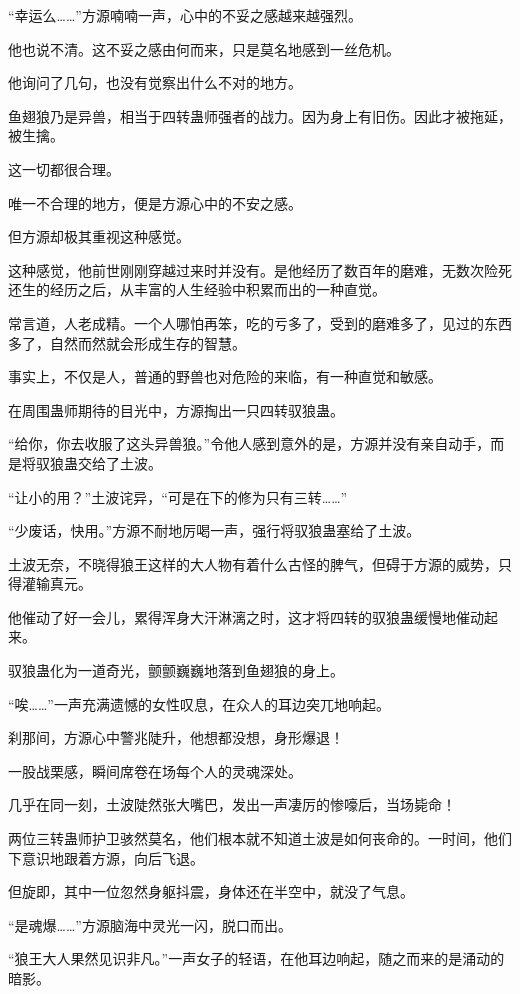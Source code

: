 \begin{this_body}
“幸运么……”方源喃喃一声，心中的不妥之感越来越强烈。

他也说不清。这不妥之感由何而来，只是莫名地感到一丝危机。

他询问了几句，也没有觉察出什么不对的地方。

鱼翅狼乃是异兽，相当于四转蛊师强者的战力。因为身上有旧伤。因此才被拖延，被生擒。

这一切都很合理。

唯一不合理的地方，便是方源心中的不安之感。

但方源却极其重视这种感觉。

这种感觉，他前世刚刚穿越过来时并没有。是他经历了数百年的磨难，无数次险死还生的经历之后，从丰富的人生经验中积累而出的一种直觉。

常言道，人老成精。一个人哪怕再笨，吃的亏多了，受到的磨难多了，见过的东西多了，自然而然就会形成生存的智慧。

事实上，不仅是人，普通的野兽也对危险的来临，有一种直觉和敏感。

在周围蛊师期待的目光中，方源掏出一只四转驭狼蛊。

“给你，你去收服了这头异兽狼。”令他人感到意外的是，方源并没有亲自动手，而是将驭狼蛊交给了土波。

“让小的用？”土波诧异，“可是在下的修为只有三转……”

“少废话，快用。”方源不耐地厉喝一声，强行将驭狼蛊塞给了土波。

土波无奈，不晓得狼王这样的大人物有着什么古怪的脾气，但碍于方源的威势，只得灌输真元。

他催动了好一会儿，累得浑身大汗淋漓之时，这才将四转的驭狼蛊缓慢地催动起来。

驭狼蛊化为一道奇光，颤颤巍巍地落到鱼翅狼的身上。

“唉……”一声充满遗憾的女性叹息，在众人的耳边突兀地响起。

刹那间，方源心中警兆陡升，他想都没想，身形爆退！

一股战栗感，瞬间席卷在场每个人的灵魂深处。

几乎在同一刻，土波陡然张大嘴巴，发出一声凄厉的惨嚎后，当场毙命！

两位三转蛊师护卫骇然莫名，他们根本就不知道土波是如何丧命的。一时间，他们下意识地跟着方源，向后飞退。

但旋即，其中一位忽然身躯抖震，身体还在半空中，就没了气息。

“是魂爆……”方源脑海中灵光一闪，脱口而出。

“狼王大人果然见识非凡。”一声女子的轻语，在他耳边响起，随之而来的是涌动的暗影。


\end{this_body}
